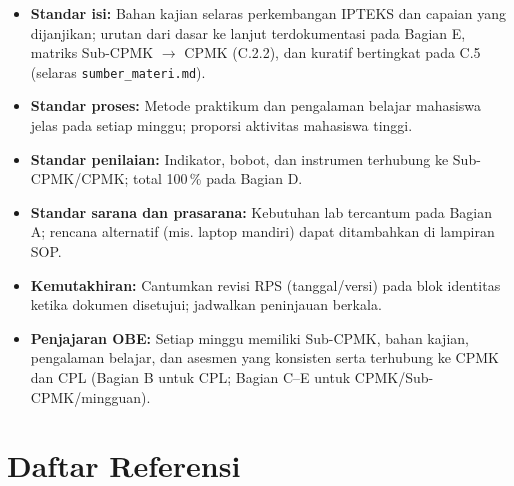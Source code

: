\documentclass[12pt,a4paper]{article}
\begin{document}
\begin{itemize}[leftmargin=*]
  \item \textbf{Standar isi:} Bahan kajian selaras perkembangan IPTEKS dan capaian yang dijanjikan; urutan dari dasar ke lanjut terdokumentasi pada Bagian E, matriks Sub-CPMK $\rightarrow$ CPMK (C.2.2), dan kuratif bertingkat pada C.5 (selaras \texttt{sumber\_materi.md}).
  \item \textbf{Standar proses:} Metode praktikum dan pengalaman belajar mahasiswa jelas pada setiap minggu; proporsi aktivitas mahasiswa tinggi.
  \item \textbf{Standar penilaian:} Indikator, bobot, dan instrumen terhubung ke Sub-CPMK/CPMK; total 100\,\% pada Bagian D.
  \item \textbf{Standar sarana dan prasarana:} Kebutuhan lab tercantum pada Bagian A; rencana alternatif (mis. laptop mandiri) dapat ditambahkan di lampiran SOP.
  \item \textbf{Kemutakhiran:} Cantumkan revisi RPS (tanggal/versi) pada blok identitas ketika dokumen disetujui; jadwalkan peninjauan berkala.
  \item \textbf{Penjajaran OBE:} Setiap minggu memiliki Sub-CPMK, bahan kajian, pengalaman belajar, dan asesmen yang konsisten serta terhubung ke CPMK dan CPL (Bagian B untuk CPL; Bagian C--E untuk CPMK/Sub-CPMK/mingguan).
\end{itemize}

\vspace{1cm}

\section*{Daftar Referensi}
\end{document}
